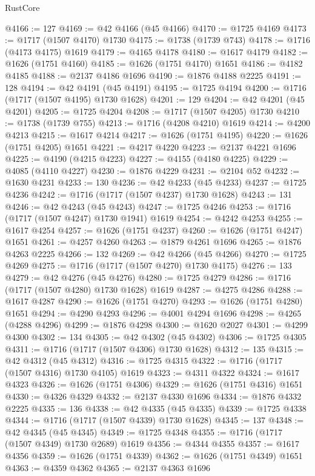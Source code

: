 \begin{lexlean}{RustCore}
\begin{coremodule}
@4166 := 127
@4169 := @42 @4166 (@45 @4166)
@4170 := @1725 @4169
@4173 := @1717 (@1507 @4170) @1730
@4175 := @1738 (@1739 @743)
@4178 := @1716 (@4173 @4175) @1619
@4179 := @4165 @4178
@4180 := @1617 @4179
@4182 := @1626 (@1751 @4160)
@4185 := @1626 (@1751 @4170) @1651
@4186 := @4182 @4185
@4188 := @2137 @4186 @1696
@4190 := @1876 @4188 @2225
@4191 := 128
@4194 := @42 @4191 (@45 @4191)
@4195 := @1725 @4194
@4200 := @1716 (@1717 (@1507 @4195) @1730 @1628)
@4201 := 129
@4204 := @42 @4201 (@45 @4201)
@4205 := @1725 @4204
@4208 := @1717 (@1507 @4205) @1730
@4210 := @1738 (@1739 @755)
@4213 := @1716 (@4208 @4210) @1619
@4214 := @4200 @4213
@4215 := @1617 @4214
@4217 := @1626 (@1751 @4195)
@4220 := @1626 (@1751 @4205) @1651
@4221 := @4217 @4220
@4223 := @2137 @4221 @1696
@4225 := @4190 (@4215 @4223)
@4227 := @4155 (@4180 @4225)
@4229 := @4085 (@4110 @4227)
@4230 := @1876 @4229
@4231 := @2104 @52
@4232 := @1630 @4231
@4233 := 130
@4236 := @42 @4233 (@45 @4233)
@4237 := @1725 @4236
@4242 := @1716 (@1717 (@1507 @4237) @1730 @1628)
@4243 := 131
@4246 := @42 @4243 (@45 @4243)
@4247 := @1725 @4246
@4253 := @1716 (@1717 (@1507 @4247) @1730 @1941) @1619
@4254 := @4242 @4253
@4255 := @1617 @4254
@4257 := @1626 (@1751 @4237)
@4260 := @1626 (@1751 @4247) @1651
@4261 := @4257 @4260
@4263 := @1879 @4261 @1696
@4265 := @1876 @4263 @2225
@4266 := 132
@4269 := @42 @4266 (@45 @4266)
@4270 := @1725 @4269
@4275 := @1716 (@1717 (@1507 @4270) @1730 @4175)
@4276 := 133
@4279 := @42 @4276 (@45 @4276)
@4280 := @1725 @4279
@4286 := @1716 (@1717 (@1507 @4280) @1730 @1628) @1619
@4287 := @4275 @4286
@4288 := @1617 @4287
@4290 := @1626 (@1751 @4270)
@4293 := @1626 (@1751 @4280) @1651
@4294 := @4290 @4293
@4296 := @4001 @4294 @1696
@4298 := @4265 (@4288 @4296)
@4299 := @1876 @4298
@4300 := @1620 @2027
@4301 := @4299 @4300
@4302 := 134
@4305 := @42 @4302 (@45 @4302)
@4306 := @1725 @4305
@4311 := @1716 (@1717 (@1507 @4306) @1730 @1628)
@4312 := 135
@4315 := @42 @4312 (@45 @4312)
@4316 := @1725 @4315
@4322 := @1716 (@1717 (@1507 @4316) @1730 @4105) @1619
@4323 := @4311 @4322
@4324 := @1617 @4323
@4326 := @1626 (@1751 @4306)
@4329 := @1626 (@1751 @4316) @1651
@4330 := @4326 @4329
@4332 := @2137 @4330 @1696
@4334 := @1876 @4332 @2225
@4335 := 136
@4338 := @42 @4335 (@45 @4335)
@4339 := @1725 @4338
@4344 := @1716 (@1717 (@1507 @4339) @1730 @1628)
@4345 := 137
@4348 := @42 @4345 (@45 @4345)
@4349 := @1725 @4348
@4355 := @1716 (@1717 (@1507 @4349) @1730 @2689) @1619
@4356 := @4344 @4355
@4357 := @1617 @4356
@4359 := @1626 (@1751 @4339)
@4362 := @1626 (@1751 @4349) @1651
@4363 := @4359 @4362
@4365 := @2137 @4363 @1696

\end{coremodule}
\end{lexlean}

